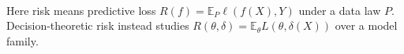 \begin{remark} \label{rem:sl-risk-versus-estimation-risk} \\
Here risk means predictive loss $R(f)=\mathbb{E}_{P}\ell(f(X),Y)$ under a data law $P$.\\
Decision-theoretic risk instead studies $R(\theta,\delta)=\mathbb{E}_{\theta}L(\theta,\delta(X))$ over a model family.
\end{remark}
